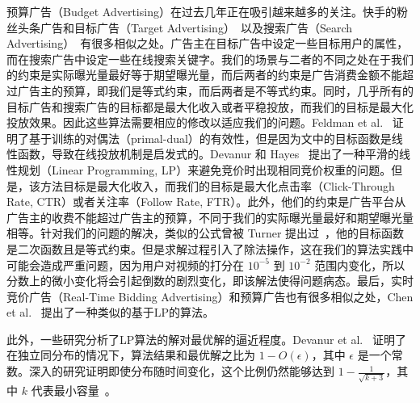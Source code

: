 预算广告（Budget Advertising）在过去几年正在吸引越来越多的关注。快手的粉丝头条广告和目标广告（Target Advertising）~\cite{xu2015smart}以及搜索广告（Search Advertising）~\cite{mehta2005adwords}有很多相似之处。广告主在目标广告中设定一些目标用户的属性，而在搜索广告中设定一些在线搜索关键字。我们的场景与二者的不同之处在于我们的约束是实际曝光量最好等于期望曝光量，而后两者的约束是广告消费金额不能超过广告主的预算，即我们是等式约束，而后两者是不等式约束。同时，几乎所有的目标广告和搜索广告的目标都是最大化收入或者平稳投放，而我们的目标是最大化投放效果。因此这些算法需要相应的修改以适应我们的问题。Feldman et al. ~\cite{feldman2010online}证明了基于训练的对偶法（primal-dual）的有效性，但是因为文中的目标函数是线性函数，导致在线投放机制是启发式的。Devanur 和 Hayes~\cite{devanur2009adwords} 提出了一种平滑的线性规划（Linear Programming, LP）来避免竞价时出现相同竞价权重的问题。但是，该方法目标是最大化收入，而我们的目标是最大化点击率（Click-Through Rate, CTR）或者关注率（Follow Rate, FTR）。此外，他们的约束是广告平台从广告主的收费不能超过广告主的预算，不同于我们的实际曝光量最好和期望曝光量相等。针对我们的问题的解决，类似的公式曾被 Turner 提出过~\cite{turner2012planning}，他的目标函数是二次函数且是等式约束。但是求解过程引入了除法操作，这在我们的算法实践中可能会造成严重问题，因为用户对视频的打分在 $10^{-5}$ 到 $10^{-2}$ 范围内变化，所以分数上的微小变化将会引起倒数的剧烈变化，即该解法使得问题病态。最后，实时竞价广告（Real-Time Bidding Advertising）和预算广告也有很多相似之处，Chen et al.~\cite{chen2011real} 提出了一种类似的基于LP的算法。

此外，一些研究分析了LP算法的解对最优解的逼近程度。Devanur et al.~\cite{devanur2011near} 证明了在独立同分布的情况下，算法结果和最优解之比为 $1-O(\epsilon)$，其中 $\epsilon$ 是一个常数。深入的研究证明即使分布随时间变化，这个比例仍然能够达到 $1-\frac{1}{\sqrt{k+3}}$，其中 $k$ 代表最小容量~\cite{alaei2012online}。

